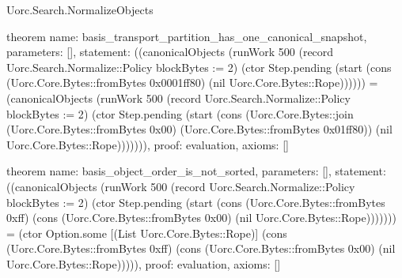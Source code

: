 \begin{lexlean}{Uorc.Search.NormalizeObjects}
\begin{semanticmodule}
theorem{
  name: basis_transport_partition_has_one_canonical_snapshot,
  parameters: [],
  statement: ((canonicalObjects (runWork 500 (record Uorc.Search.Normalize::Policy {blockBytes := 2}) (ctor Step.pending (start (cons (Uorc.Core.Bytes::fromBytes 0x0001ff80) (nil Uorc.Core.Bytes::Rope)))))) = (canonicalObjects (runWork 500 (record Uorc.Search.Normalize::Policy {blockBytes := 2}) (ctor Step.pending (start (cons (Uorc.Core.Bytes::join (Uorc.Core.Bytes::fromBytes 0x00) (Uorc.Core.Bytes::fromBytes 0x01ff80)) (nil Uorc.Core.Bytes::Rope))))))),
  proof: evaluation{},
  axioms: []
}

theorem{
  name: basis_object_order_is_not_sorted,
  parameters: [],
  statement: ((canonicalObjects (runWork 500 (record Uorc.Search.Normalize::Policy {blockBytes := 2}) (ctor Step.pending (start (cons (Uorc.Core.Bytes::fromBytes 0xff) (cons (Uorc.Core.Bytes::fromBytes 0x00) (nil Uorc.Core.Bytes::Rope))))))) = (ctor Option.some [(List Uorc.Core.Bytes::Rope)] (cons (Uorc.Core.Bytes::fromBytes 0xff) (cons (Uorc.Core.Bytes::fromBytes 0x00) (nil Uorc.Core.Bytes::Rope))))),
  proof: evaluation{},
  axioms: []
}
\end{semanticmodule}
\end{lexlean}
